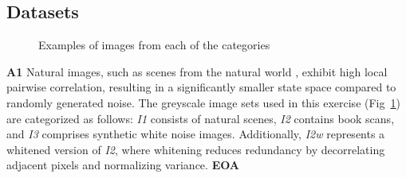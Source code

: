 \documentclass[11pt, twocolumn]{article}
\begin{document}
\subsection{Datasets}
\vspace{-1em}
\begin{figure}[ht]
    \centering
    \caption{Examples of images from each of the categories}
    \label{fig:1}
\end{figure}

\textbf{A1} Natural images, such as scenes from the natural world \cite{zhu_2023_statistics}, exhibit high local pairwise correlation, resulting in a significantly smaller state space compared to randomly generated noise. The greyscale image sets used in this exercise (Fig~\ref{fig:1}) are categorized as follows: \textit{I1} consists of natural scenes, \textit{I2} contains book scans, and \textit{I3} comprises synthetic white noise images. Additionally, \textit{I2w} represents a whitened version of \textit{I2}, where whitening reduces redundancy by decorrelating adjacent pixels and normalizing variance. \textbf{EOA}
\end{document}
